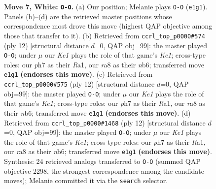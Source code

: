 \documentclass[11pt]{article}
\begin{document}
\begin{figure}[p]
\caption{\textbf{Move 7, White: \texttt{O-O}.} (a) Our position; Melanie plays \texttt{O-O} (\texttt{e1g1}). Panels (b)--(d) are the retrieved master positions whose correspondence most drove this move (highest QAP objective among those that transfer to it). (b) Retrieved from \texttt{ccrl\_top\_p0000\#574} (ply 12) [structural distance $d$=0, QAP obj=99]: the master played \texttt{O-O}; under $\mu$ our \emph{Ke1} plays the role of that game's \emph{Ke1}; cross-type roles: our \emph{p}h7 as their \emph{R}a1, our \emph{r}a8 as their \emph{n}b6; transferred move \texttt{e1g1} \textbf{(endorses this move)}. (c) Retrieved from \texttt{ccrl\_top\_p0000\#575} (ply 12) [structural distance $d$=0, QAP obj=99]: the master played \texttt{O-O}; under $\mu$ our \emph{Ke1} plays the role of that game's \emph{Ke1}; cross-type roles: our \emph{p}h7 as their \emph{R}a1, our \emph{r}a8 as their \emph{n}b6; transferred move \texttt{e1g1} \textbf{(endorses this move)}. (d) Retrieved from \texttt{ccrl\_top\_p0000\#1468} (ply 12) [structural distance $d$=0, QAP obj=99]: the master played \texttt{O-O}; under $\mu$ our \emph{Ke1} plays the role of that game's \emph{Ke1}; cross-type roles: our \emph{p}h7 as their \emph{R}a1, our \emph{r}a8 as their \emph{n}b6; transferred move \texttt{e1g1} \textbf{(endorses this move)}. Synthesis: 24 retrieved analogs transferred to \texttt{O-O} (summed QAP objective 2298, the strongest correspondence among the candidate moves); Melanie committed it via the \texttt{search} selector.}
\label{fig:thought-m12}
\end{figure}

\clearpage
\end{document}
